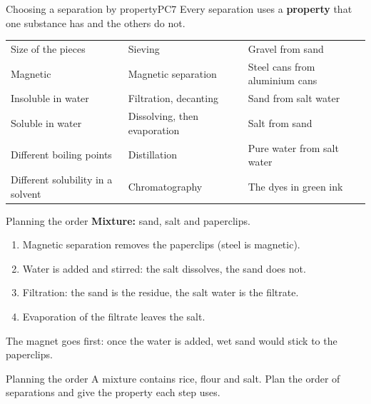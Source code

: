 
\begin{technique}{Choosing a separation by property}{PC7}
Every separation uses a \textbf{property} that one substance has and the others do not.
\begin{ctab}
\renewcommand{\arraystretch}{1.3}
\begin{tabular}{|L{4.4cm}|L{4.6cm}|L{5.4cm}|}
  \hline{} &  &  \\ \hline
  Size of the pieces & Sieving & Gravel from sand \\ \hline
  Magnetic & Magnetic separation & Steel cans from aluminium cans \\ \hline
  Insoluble in water & Filtration, decanting & Sand from salt water \\ \hline
  Soluble in water & Dissolving, then evaporation & Salt from sand \\ \hline
  Different boiling points & Distillation & Pure water from salt water \\ \hline
  Different solubility in a solvent & Chromatography & The dyes in green ink \\ \hline
\end{tabular}
\end{ctab}
\end{technique}

\begin{workedex}{Planning the order}
\textbf{Mixture:} sand, salt and paperclips.
\begin{enumerate}[leftmargin=1.6em, itemsep=0pt, topsep=2pt]
  \item Magnetic separation removes the paperclips (steel is magnetic).
  \item Water is added and stirred: the salt dissolves, the sand does not.
  \item Filtration: the sand is the residue, the salt water is the filtrate.
  \item Evaporation of the filtrate leaves the salt.
\end{enumerate}
The magnet goes first: once the water is added, wet sand would stick to the paperclips.
\end{workedex}

\begin{wedo}{Planning the order}
A mixture contains rice, flour and salt. Plan the order of separations and give the property each step uses.
\answerbox{5cm}
\end{wedo}

